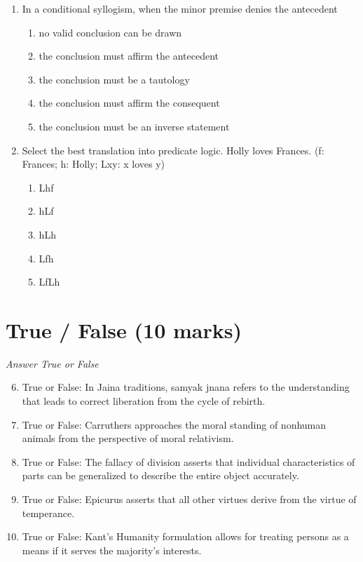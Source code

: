 \documentclass[12pt]{article}
\begin{document}
\begin{enumerate}[label=\arabic*.]
\begin{enumerate}[label=(\alph*)]
\end{enumerate}
\item In a conditional syllogism, when the minor premise denies the antecedent
\begin{enumerate}[label=(\alph*)]
    \item no valid conclusion can be drawn
    \item the conclusion must affirm the antecedent
    \item the conclusion must be a tautology
    \item the conclusion must affirm the consequent
    \item the conclusion must be an inverse statement
\end{enumerate}
\item Select the best translation into predicate logic. Holly loves Frances. (f: Frances; h: Holly; Lxy: x loves y)
\begin{enumerate}[label=(\alph*)]
    \item Lhf
    \item hLf
    \item hLh
    \item Lfh
    \item LfLh
\end{enumerate}
\end{enumerate}

\section*{True / False (10 marks)}
\textit{Answer True or False}
\begin{enumerate}[label=\arabic*.]
\setcounter{enumi}{5}
\item True or False: In Jaina traditions, samyak jnana refers to the understanding that leads to correct liberation from the cycle of rebirth.
\item True or False: Carruthers approaches the moral standing of nonhuman animals from the perspective of moral relativism.
\item True or False: The fallacy of division asserts that individual characteristics of parts can be generalized to describe the entire object accurately.
\item True or False: Epicurus asserts that all other virtues derive from the virtue of temperance.
\item True or False: Kant's Humanity formulation allows for treating persons as a means if it serves the majority's interests.
\end{enumerate}
\end{document}
